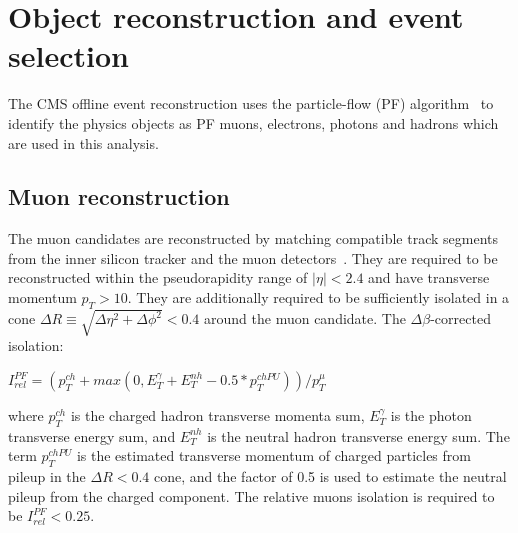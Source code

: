 \section{Object reconstruction and event selection}
\label{event_sel}

The CMS offline event reconstruction uses the particle-flow (PF)
algorithm~\cite{CMS-PAS-PFT-10-002} to identify the physics objects as PF
muons, electrons, photons and hadrons which are used in this analysis.

\subsection{Muon reconstruction}

The muon candidates are reconstructed by matching compatible track segments
from the inner silicon tracker and the muon detectors~\cite{Chatrchyan:2012xi}.
They are required to be reconstructed within the pseudorapidity range of
$|\eta|< 2.4$ and have transverse momentum $p_{T} > 10$.
They are additionally required to be sufficiently isolated in a cone
$\Delta R\equiv\sqrt{\Delta\eta^{2}+\Delta\phi^{2}}<0.4$ around the
muon candidate. The $\Delta \beta$-corrected isolation:

$I_{rel}^{PF}=(p_{T}^{ch}+max(0,E_{T}^{\gamma}+E_{T}^{nh}-0.5*p_{T}^{chPU}))/p_{T}^{\mu}$

where $p_{T}^{ch}$ is the charged hadron transverse momenta sum,
$E_{T}^{\gamma}$ is the photon transverse energy sum, and $E_{T}^{nh}$
is the neutral hadron transverse energy sum. The term $p_{T}^{chPU}$ is the estimated
transverse momentum of charged particles from pileup in the $\Delta R < 0.4$ cone,
and the factor of 0.5 is used to estimate the neutral pileup from the charged component.
The relative muons isolation is required to be $I_{rel}^{PF}<0.25$.




